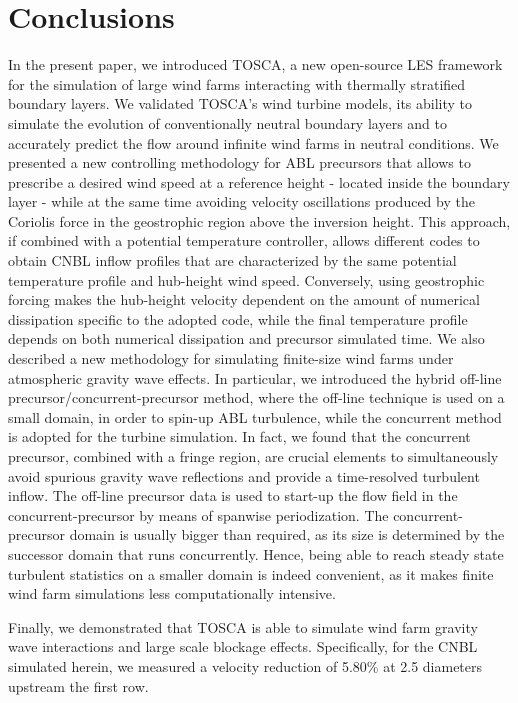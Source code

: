 \documentclass[journal abbreviation, manuscript]{copernicus}
\begin{document}
\section{Conclusions}
\label{sec:conclusions}
In the present paper, we introduced TOSCA, a new open-source LES framework for the simulation of large wind farms interacting with thermally stratified boundary layers. We validated TOSCA's wind turbine models, its ability to simulate the evolution of conventionally neutral boundary layers and to accurately predict the flow around infinite wind farms in neutral conditions. We presented a new controlling methodology for ABL precursors that allows to prescribe a desired wind speed at a reference height - located inside the boundary layer - while at the same time avoiding velocity oscillations produced by the Coriolis force in the geostrophic region above the inversion height. This approach, if combined with a potential temperature controller, allows different codes to obtain CNBL inflow profiles that are characterized by the same potential temperature profile and hub-height wind speed. Conversely, using geostrophic forcing makes the hub-height velocity dependent on the amount of numerical dissipation specific to the adopted code, while the final temperature profile depends on both numerical dissipation and precursor simulated time. We also described a new methodology for simulating finite-size wind farms under atmospheric gravity wave effects. In particular, we introduced the hybrid off-line precursor/concurrent-precursor method, where the off-line technique is used on a small domain, in order to spin-up ABL turbulence, while the concurrent method is adopted for the turbine simulation. In fact, we found that the concurrent precursor, combined with a fringe region, are crucial elements to simultaneously avoid spurious gravity wave reflections and provide a time-resolved turbulent inflow. The off-line precursor data is used to start-up the flow field in the concurrent-precursor by means of spanwise periodization. The concurrent-precursor domain is usually bigger than required, as its size is determined by the successor domain that runs concurrently. Hence, being able to reach steady state turbulent statistics on a smaller domain is indeed convenient, as it makes finite wind farm simulations less computationally intensive. 

Finally, we demonstrated that TOSCA is able to simulate wind farm gravity wave interactions and large scale blockage effects. Specifically, for the CNBL simulated herein, we measured a velocity reduction of 5.80\% at 2.5 diameters upstream the first row.
\end{document}
